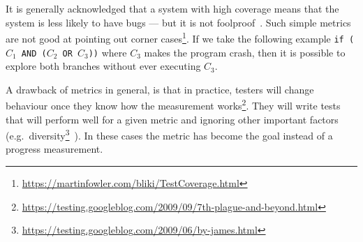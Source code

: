 \documentclass[a4paper,11pt]{sdm_internship}
\theoremstyle{definition}
\begin{document}
It is generally acknowledged that a system with high coverage means that the system is less likely to have bugs --- but it is not foolproof~\cite{hovemeyer2004finding,inozemtseva2014coverage}.
Such simple metrics are not good at pointing out corner cases\footnote{\url{https://martinfowler.com/bliki/TestCoverage.html}}.
If we take the following example \texttt{if ($C_1$ AND ($C_2$ OR $C_3$))} where $C_3$ makes the program crash, then it is possible to explore both branches without ever executing $C_3$.

A drawback of metrics in general, is that in practice, testers will change behaviour once they know how the measurement works\footnote{\url{https://testing.googleblog.com/2009/09/7th-plague-and-beyond.html}}.
They will write tests that will perform well for a given metric and ignoring other important factors (e.g.\ diversity\footnote{\url{https://testing.googleblog.com/2009/06/by-james.html}}~\cite{baudry2014diversify,baudry2015multiple}).
In these cases the metric has become the goal instead of a progress measurement.

\end{document}
